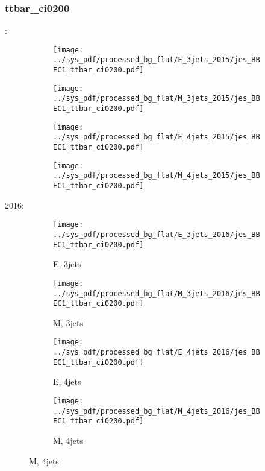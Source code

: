 \documentclass{beamer}
\begin{document}
\begin{frame}
\frametitle{ttbar_ci0200}
\fontsize{5}{1}:
\begin{figure}
\centering
\begin{subfigure}[b]{0.24\textwidth}
\texttt{[image: ../sys\_pdf/processed\_bg\_flat/E\_3jets\_2015/jes\_BBEC1\_ttbar\_ci0200.pdf]}
\end{subfigure}
\begin{subfigure}[b]{0.24\textwidth}
\texttt{[image: ../sys\_pdf/processed\_bg\_flat/M\_3jets\_2015/jes\_BBEC1\_ttbar\_ci0200.pdf]}
\end{subfigure}
\begin{subfigure}[b]{0.24\textwidth}
\texttt{[image: ../sys\_pdf/processed\_bg\_flat/E\_4jets\_2015/jes\_BBEC1\_ttbar\_ci0200.pdf]}
\end{subfigure}
\begin{subfigure}[b]{0.24\textwidth}
\texttt{[image: ../sys\_pdf/processed\_bg\_flat/M\_4jets\_2015/jes\_BBEC1\_ttbar\_ci0200.pdf]}
\end{subfigure}
\end{figure}
2016:
\begin{figure}
\centering
\begin{subfigure}[b]{0.24\textwidth}
\texttt{[image: ../sys\_pdf/processed\_bg\_flat/E\_3jets\_2016/jes\_BBEC1\_ttbar\_ci0200.pdf]}
\captionsetup{font=tiny}
\caption{E, 3jets}
\end{subfigure}
\begin{subfigure}[b]{0.24\textwidth}
\texttt{[image: ../sys\_pdf/processed\_bg\_flat/M\_3jets\_2016/jes\_BBEC1\_ttbar\_ci0200.pdf]}
\captionsetup{font=tiny}
\caption{M, 3jets}
\end{subfigure}
\begin{subfigure}[b]{0.24\textwidth}
\texttt{[image: ../sys\_pdf/processed\_bg\_flat/E\_4jets\_2016/jes\_BBEC1\_ttbar\_ci0200.pdf]}
\captionsetup{font=tiny}
\caption{E, 4jets}
\end{subfigure}
\begin{subfigure}[b]{0.24\textwidth}
\texttt{[image: ../sys\_pdf/processed\_bg\_flat/M\_4jets\_2016/jes\_BBEC1\_ttbar\_ci0200.pdf]}
\captionsetup{font=tiny}
\caption{M, 4jets}
\end{subfigure}
\end{figure}
\end{frame}
\end{document}
